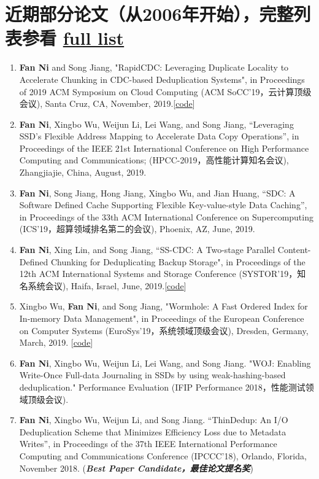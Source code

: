 \documentclass{article}
\begin{document}
\section{近期部分论文（从2006年开始），完整列表参看 \href{https://scholar.google.com/citations?user=xMbxve0AAAAJ&hl=en}{full list}}
\begin{enumerate}
\it
    \item \textbf{Fan Ni} and Song Jiang, "RapidCDC: Leveraging Duplicate Locality to Accelerate Chunking in CDC-based Deduplication Systems", in Proceedings of 2019 ACM Symposium on Cloud Computing (ACM SoCC'19，云计算顶级会议), Santa Cruz, CA, November, 2019.[\href{https://github.com/moking/RapidCDC}{code}]
    \item \textbf{Fan Ni}, Xingbo Wu, Weijun Li, Lei Wang, and Song Jiang, “Leveraging SSD's Flexible Address Mapping to Accelerate Data Copy Operations”, in Proceedings of the IEEE 21st International Conference on High Performance Computing and Communications; (HPCC-2019，高性能计算知名会议), Zhangjiajie, China, August, 2019.
    \item \textbf{Fan Ni}, Song Jiang, Hong Jiang, Xingbo Wu, and Jian Huang, “SDC: A Software Defined Cache Supporting Flexible Key-value-style Data Caching”, in Proceedings of the 33th ACM International Conference on Supercomputing (ICS'19，超算领域排名第二的会议), Phoenix, AZ, June, 2019.
\item \textbf{Fan Ni}, Xing Lin, and Song Jiang, “SS-CDC: A Two-stage Parallel Content-Defined Chunking for Deduplicating Backup Storage", in Proceedings of the 12th ACM International Systems and Storage Conference (SYSTOR'19，知名系统会议), Haifa, Israel, June, 2019.[\href{https://github.com/NetApp/SS-CDC}{code}]
\item Xingbo Wu, \textbf{Fan Ni}, and Song Jiang, "Wormhole: A Fast Ordered Index for In-memory Data Management", in Proceedings of the European Conference on Computer Systems (EuroSys'19，系统领域顶级会议), Dresden, Germany, March, 2019. [\href{https://github.com/wuxb45/wormhole}{code}]
\item \textbf{Fan Ni}, Xingbo Wu, Weijun Li, Lei Wang, and Song Jiang. "WOJ: Enabling Write-Once Full-data Journaling in SSDs by using weak-hashing-based deduplication." Performance Evaluation (IFIP Performance 2018，性能测试领域顶级会议).
\item \textbf{Fan Ni}, Xingbo Wu, Weijun Li, and Song Jiang. “ThinDedup: An I/O Deduplication Scheme that Minimizes Efficiency Loss due to Metadata Writes”, in Proceedings of the 37th IEEE International Performance Computing and Communications Conference (IPCCC'18), Orlando, Florida, November 2018. (\textbf{\it \textbf{Best Paper Candidate，最佳论文提名奖}})

\end{enumerate}
\end{document}
